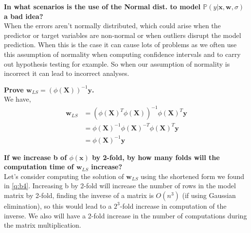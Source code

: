 \begin{appendices}
\begin{question}
    \textbf{In what scenarios is the use of the Normal dist. to model $\mathbb{P}(y|\bm{x},\bm{w},\sigma)$ a bad idea?} \\
    When the errors aren't normally distributed, which could arise when the predictor or target variables are non-normal or when outliers disrupt the model prediction. 
    When this is the case it can cause lots of problems as we often use this assumption of normality when computing confidence intervals and to carry out hypothesis testing for example. So when our assumption of normality is incorrect it can lead to incorrect analyses. 
\end{question}

\begin{question}\label{q:b4}
    \textbf{Prove $\bm{w}_{LS} = (\phi(\bm{X}))^{-1} \bm{y}$.} \\
    We have,
    \begin{align}
        \bm{w}_{LS} {}& = (\phi(\bm{X})^{T} \phi(\bm{X}))^{-1} \phi(\bm{X})^{T} \bm{y} \\
        & = \phi(\bm{X})^{-1} \phi(\bm{X})^{-T} \phi(\bm{X})^{T} \bm{y} \\
        & = \phi(\bm{X})^{-1} \bm{y}
    \end{align}
\end{question}

\begin{question}
    \textbf{If we increase b of $\phi(\bm{x})$ by 2-fold, by how many folds will the computation time of $\bm{w}_{LS}$ increase?} \\
    Let's consider computing the solution of $\bm{w}_{LS}$ using the shortened form we found in \cref{q:b4}.
    Increasing b by 2-fold will increase the number of rows in the model matrix by 2-fold, finding the inverse of a matrix is $O(n^{3})$ (if using Gaussian elimination), so this would lead to a $2^{3}$-fold increase in computation of the inverse. We also will have a 2-fold increase in the number of computations during the matrix multiplication.
\end{question}


\end{appendices}
